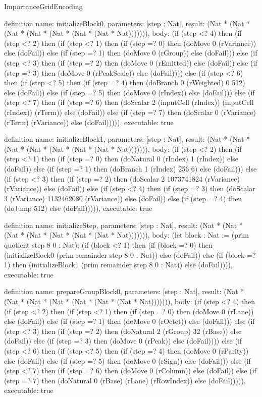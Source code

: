 \begin{lexlean}{ImportanceGridEncoding}
\begin{semanticmodule}
definition{
  name: initializeBlock0,
  parameters: [step : Nat],
  result: (Nat * (Nat * (Nat * (Nat * (Nat * (Nat * (Nat * Nat))))))),
  body: (if (step <? 4) then
      (if (step <? 2) then
      (if (step <? 1) then
      (if (step =? 0) then (doMove 0 (rVariance)) else (doFail)) else
      (if (step =? 1) then (doMove 0 (rGroup)) else (doFail))) else
      (if (step <? 3) then
      (if (step =? 2) then (doMove 0 (rEmitted)) else (doFail)) else
      (if (step =? 3) then (doMove 0 (rPeakScale)) else (doFail)))) else
      (if (step <? 6) then
      (if (step <? 5) then
      (if (step =? 4) then (doBranch 0 (rWeighted) 0 512) else (doFail)) else
      (if (step =? 5) then (doMove 0 (rIndex)) else (doFail))) else
      (if (step <? 7) then
      (if (step =? 6) then (doScalar 2 (inputCell (rIndex)) (inputCell (rIndex)) (rTerm)) else (doFail)) else
      (if (step =? 7) then (doScalar 0 (rVariance) (rTerm) (rVariance)) else (doFail))))),
  executable: true
}

definition{
  name: initializeBlock1,
  parameters: [step : Nat],
  result: (Nat * (Nat * (Nat * (Nat * (Nat * (Nat * (Nat * Nat))))))),
  body: (if (step <? 2) then
      (if (step <? 1) then
      (if (step =? 0) then (doNatural 0 (rIndex) 1 (rIndex)) else (doFail)) else
      (if (step =? 1) then (doBranch 1 (rIndex) 256 6) else (doFail))) else
      (if (step <? 3) then
      (if (step =? 2) then (doScalar 2 1073741824 (rVariance) (rVariance)) else (doFail)) else
      (if (step <? 4) then
      (if (step =? 3) then (doScalar 3 (rVariance) 1132462080 (rVariance)) else (doFail)) else
      (if (step =? 4) then (doJump 512) else (doFail))))),
  executable: true
}

definition{
  name: initializeStep,
  parameters: [step : Nat],
  result: (Nat * (Nat * (Nat * (Nat * (Nat * (Nat * (Nat * Nat))))))),
  body: (let block : Nat := (prim quotient step 8 0 : Nat); (if (block <? 1) then
      (if (block =? 0) then (initializeBlock0 (prim remainder step 8 0 : Nat)) else (doFail)) else
      (if (block =? 1) then (initializeBlock1 (prim remainder step 8 0 : Nat)) else (doFail)))),
  executable: true
}

definition{
  name: prepareGroupBlock0,
  parameters: [step : Nat],
  result: (Nat * (Nat * (Nat * (Nat * (Nat * (Nat * (Nat * Nat))))))),
  body: (if (step <? 4) then
      (if (step <? 2) then
      (if (step <? 1) then
      (if (step =? 0) then (doMove 0 (rLane)) else (doFail)) else
      (if (step =? 1) then (doMove 0 (rOctet)) else (doFail))) else
      (if (step <? 3) then
      (if (step =? 2) then (doNatural 2 (rGroup) 32 (rBase)) else (doFail)) else
      (if (step =? 3) then (doMove 0 (rPeak)) else (doFail)))) else
      (if (step <? 6) then
      (if (step <? 5) then
      (if (step =? 4) then (doMove 0 (rParity)) else (doFail)) else
      (if (step =? 5) then (doMove 0 (rSign)) else (doFail))) else
      (if (step <? 7) then
      (if (step =? 6) then (doMove 0 (rColumn)) else (doFail)) else
      (if (step =? 7) then (doNatural 0 (rBase) (rLane) (rRowIndex)) else (doFail))))),
  executable: true
}


\end{semanticmodule}
\end{lexlean}
